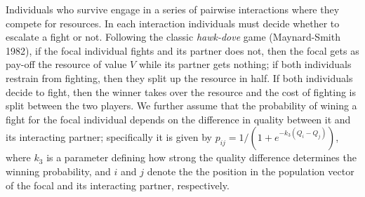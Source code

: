 \documentclass[
  12pt,
]{article}
\begin{document}
Individuals who survive engage in a series of pairwise interactions
where they compete for resources. In each interaction individuals must
decide whether to escalate a fight or not. Following the classic
\emph{hawk-dove} game (Maynard-Smith 1982), if the focal individual
fights and its partner does not, then the focal gets as pay-off the
resource of value \(V\) while its partner gets nothing; if both
individuals restrain from fighting, then they split up the resource in
half. If both individuals decide to fight, then the winner takes over
the resource and the cost of fighting is split between the two players.
We further assume that the probability of wining a fight for the focal
individual depends on the difference in quality between it and its
interacting partner; specifically it is given by
\(p_{ij}=1/(1+e^{-k_3(Q_i-Q_j)})\), where \(k_3\) is a parameter
defining how strong the quality difference determines the winning
probability, and \(i\) and \(j\) denote the the position in the
population vector of the focal and its interacting partner,
respectively.
\end{document}
